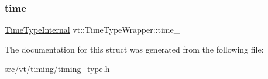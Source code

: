 \subsubsection{\texorpdfstring{time\+\_\+}{time\_}}
{\footnotesize\ttfamily \hyperlink{structvt_1_1_time_type_wrapper_a932f8d925e6c43e898fb8761ea667ef1}{Time\+Type\+Internal} vt\+::\+Time\+Type\+Wrapper\+::time\+\_\+\hspace{0.3cm}{\ttfamily [private]}}



The documentation for this struct was generated from the following file\+:\begin{DoxyCompactItemize}
\item 
src/vt/timing/\hyperlink{timing__type_8h}{timing\+\_\+type.\+h}\end{DoxyCompactItemize}
